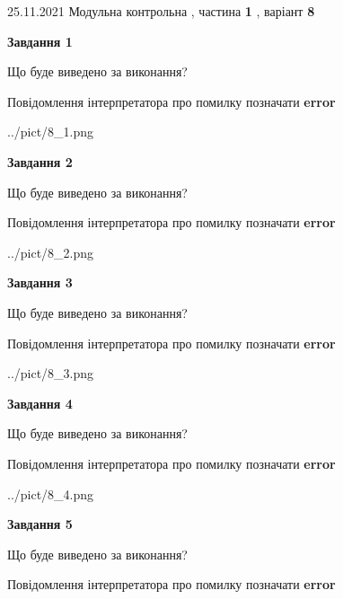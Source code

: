 \documentclass[10pt, ukrainian]{article}
\begin{document}
{25.11.2021 Модульна контрольна , частина \textbf { 1 }, варіант  \No \textbf { 8 }\par}
{
\begin {large}

{\begin {center}\textbf{Завдання 1}\end {center}}\par
Що буде виведено за виконання? \par
Повідомлення інтерпретатора про помилку позначати \textbf{error}

\begin{center}
	{../pict/8_1.png}
\end{center}
\newpage

{\begin {center}\textbf{Завдання 2}\end {center}}\par
Що буде виведено за виконання? \par
Повідомлення інтерпретатора про помилку позначати \textbf{error}

\begin{center}
	{../pict/8_2.png}
\end{center}
\newpage

{\begin {center}\textbf{Завдання 3}\end {center}}\par
Що буде виведено за виконання? \par
Повідомлення інтерпретатора про помилку позначати \textbf{error}

\begin{center}
	{../pict/8_3.png}
\end{center}
\newpage

{\begin {center}\textbf{Завдання 4}\end {center}}\par
Що буде виведено за виконання? \par
Повідомлення інтерпретатора про помилку позначати \textbf{error}

\begin{center}
	{../pict/8_4.png}
\end{center}
\newpage

{\begin {center}\textbf{Завдання 5}\end {center}}\par
Що буде виведено за виконання? \par
Повідомлення інтерпретатора про помилку позначати \textbf{error}


\end{large}}
\end{document}
